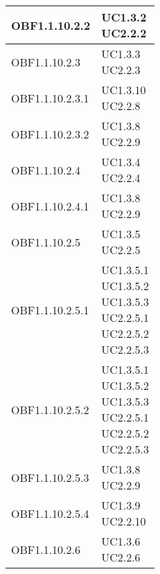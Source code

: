 \documentclass{scalatekids-article}
\begin{document}
\begin{longtable}[H]{|p{5.5cm}|p{5.5cm}|}
  \hline
  OBF1.1.10.2.2 & \multiLineCell[t]{UC1.3.2\\UC2.2.2\\}\\
  \hline
  OBF1.1.10.2.3 & \multiLineCell[t]{UC1.3.3\\UC2.2.3\\}\\
  \hline
  OBF1.1.10.2.3.1 & \multiLineCell[t]{UC1.3.10\\UC2.2.8\\}\\
  \hline
  OBF1.1.10.2.3.2 & \multiLineCell[t]{UC1.3.8\\UC2.2.9\\}\\
  \hline
  OBF1.1.10.2.4 & \multiLineCell[t]{UC1.3.4\\UC2.2.4\\}\\
  \hline
  OBF1.1.10.2.4.1 & \multiLineCell[t]{UC1.3.8\\UC2.2.9\\}\\
  \hline
  OBF1.1.10.2.5 & \multiLineCell[t]{UC1.3.5\\UC2.2.5\\}\\
  \hline
  OBF1.1.10.2.5.1 & \multiLineCell[t]{UC1.3.5.1\\UC1.3.5.2\\UC1.3.5.3\\UC2.2.5.1\\UC2.2.5.2\\UC2.2.5.3\\}\\
  \hline
  OBF1.1.10.2.5.2 & \multiLineCell[t]{UC1.3.5.1\\UC1.3.5.2\\UC1.3.5.3\\UC2.2.5.1\\UC2.2.5.2\\UC2.2.5.3\\}\\
  \hline
  OBF1.1.10.2.5.3 & \multiLineCell[t]{UC1.3.8\\UC2.2.9\\}\\
  \hline
  OBF1.1.10.2.5.4 & \multiLineCell[t]{UC1.3.9\\UC2.2.10\\}\\
  \hline
  OBF1.1.10.2.6 & \multiLineCell[t]{UC1.3.6\\UC2.2.6\\}\\

\end{longtable}
\end{document}
